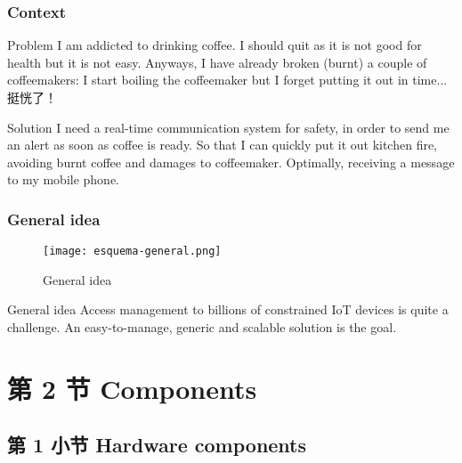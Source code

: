 \documentclass[
    aspectratio=169,                   %
]{beamer}
\begin{document}
    \begin{frame}
        \frametitle{Context}

        \begin{block}{Problem}
            I am addicted to drinking coffee. I should quit as it is not good for health but it is not easy. Anyways, I have already broken (burnt) a couple of coffeemakers: I start boiling the coffeemaker but I forget putting it out in time... 挺恍了！
        \end{block}

        \begin{block}{Solution}
            I need a real-time communication system for safety, in order to send me an alert as soon as coffee is ready. So that I can quickly put it out kitchen fire, avoiding burnt coffee and damages to coffeemaker. Optimally, receiving a message to my mobile phone.
        \end{block}

    \end{frame}

    \begin{frame}
        \frametitle{General idea}

        \begin{figure}
            \centering
            \begin{stampbox}
                \texttt{[image: esquema-general.png]}
            \end{stampbox}
            \caption{General idea}
        \end{figure}
        
        \begin{block}{General idea}
            Access management to billions of constrained IoT devices is quite a challenge. An easy-to-manage, generic and scalable solution is the goal.
        \end{block}

    \end{frame}

\section{第 2 节 Components}

\subsection{第 1 小节 Hardware components}
\end{document}
